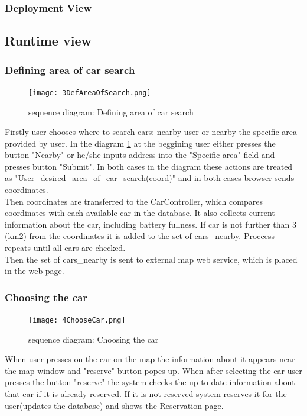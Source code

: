 \documentclass[12pt, letterpaper]{article}
\begin{document}
\subsubsection{Deployment View} 




\newpage
\subsection{Runtime view}
\subsubsection{Defining area of car search}
\begin{figure}[H]
\centering
\texttt{[image: 3DefAreaOfSearch.png]} 
\caption{sequence diagram: Defining area of car search}
\label{fig:3DefAreaOfSearch}
\end{figure}
\newpage
Firstly user chooses where to search cars: nearby user or nearby the specific area provided by user. In the diagram \ref{fig:3DefAreaOfSearch} at the beggining user either presses the button "Nearby" or he/she inputs address into the "Specific area" field and presses button "Submit". In both cases in the diagram these actions are treated as "User\_desired\_area\_of\_car\_search(coord)" and in both cases browser sends coordinates. \\
Then coordinates are transferred to the CarController, which compares coordinates with each available car in the database. It also collects current information about the car, including battery fullness.  If car is not further than 3 (km2) from the coordinates it is added to the set of cars\_nearby. Proccess repeats until all cars are checked. \\
Then the set of cars\_nearby is sent to external map web service, which is placed in the web page.  
\newpage
\subsubsection{Choosing the car}
\begin{figure}[H]
\centering
\texttt{[image: 4ChooseCar.png]} 
\caption{sequence diagram: Choosing the car}
\label{fig:4ChooseCar}
\end{figure}
\newpage
When user presses on the car on the map the information about it appears near the map window and "reserve" button popes up. When after selecting the car user presses the button "reserve" the system checks the up-to-date information about that car if it is already reserved. If it is not reserved system reserves it for the user(updates the database) and shows the Reservation page.  
\newpage
\end{document}
